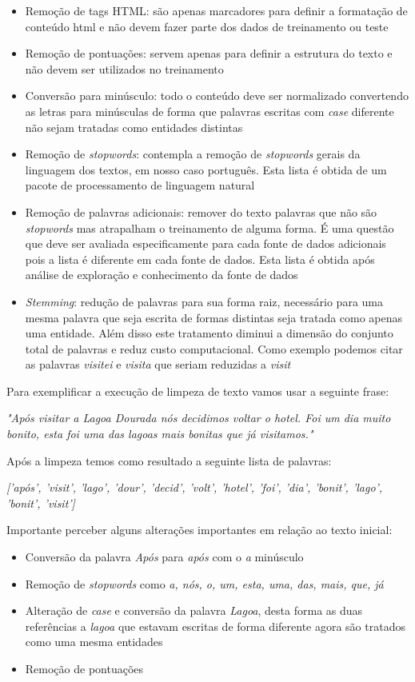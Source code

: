 \begin{itemize}
    \item Remoção de tags HTML: são apenas marcadores para definir a formatação de conteúdo html e não devem fazer parte dos dados de treinamento ou teste
    \item Remoção de pontuações: servem apenas para definir a estrutura do texto e não devem ser utilizados no treinamento
    \item Conversão para minúsculo: todo o conteúdo deve ser normalizado convertendo as letras para minúsculas de forma que palavras escritas com 
    \textit{case} diferente não sejam tratadas como entidades distintas
    \item Remoção de \textit{stopwords}: contempla a remoção de \textit{stopwords} gerais da linguagem dos textos, em nosso caso português. Esta lista é 
    obtida de um pacote de processamento de linguagem natural
    \item Remoção de palavras adicionais: remover do texto palavras que não são \textit{stopwords} mas atrapalham o treinamento de alguma forma. 
    É uma questão que deve ser avaliada especificamente para cada fonte de dados adicionais pois a lista é diferente em cada fonte de dados. Esta lista é obtida após análise de exploração e conhecimento da fonte de dados 
    \item \textit{Stemming}: redução de palavras para sua forma raiz, necessário para uma mesma palavra que seja escrita de formas distintas seja 
    tratada como apenas uma entidade. Além disso este tratamento diminui a dimensão do conjunto total de palavras e reduz custo computacional.
    Como exemplo podemos citar as palavras \textit{visitei} e \textit{visita} que seriam reduzidas a \textit{visit}
\end{itemize}

Para exemplificar a execução de limpeza de texto vamos usar a seguinte frase: 

\textit{"Após visitar a Lagoa Dourada nós decidimos voltar o hotel. Foi um dia muito bonito, esta foi uma das lagoas mais bonitas que já visitamos."}

Após a limpeza temos como resultado a seguinte lista de palavras: 

\textit{['após', 'visit', 'lago', 'dour', 'decid', 'volt', 'hotel', 'foi', 'dia', 'bonit', 'lago', 'bonit', 'visit']}

Importante perceber alguns alterações importantes em relação ao texto inicial:

\begin{itemize}
    \item Conversão da palavra \textit{Após} para \textit{após} com o \textit{a} minúsculo
    \item Remoção de \textit{stopwords} como \textit{a, nós, o, um, esta, uma, das, mais, que, já}
    \item Alteração de \textit{case} e conversão da palavra \textit{Lagoa}, desta forma as duas referências a \textit{lagoa} que estavam escritas de 
    forma diferente agora são tratados como uma mesma entidades
    \item Remoção de pontuações
\end{itemize}

